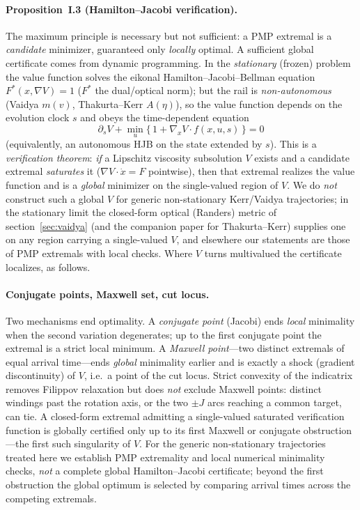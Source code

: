 \documentclass[12pt]{iopart}
\begin{document}
\paragraph{Proposition~I.3 (Hamilton--Jacobi verification).} The maximum
principle is necessary but not sufficient: a PMP extremal is a \emph{candidate}
minimizer, guaranteed only \emph{locally} optimal. A sufficient global certificate
comes from dynamic programming. In the \emph{stationary} (frozen) problem the value
function solves the eikonal Hamilton--Jacobi--Bellman equation
$F^\ast(x,\nabla V)=1$ ($F^\ast$ the dual/optical norm); but the rail is
\emph{non-autonomous} (Vaidya $m(v)$, Thakurta--Kerr $A(\eta)$), so the value function
depends on the evolution clock $s$ and obeys the time-dependent equation
\begin{equation}
  \partial_s V+\min_{u}\big\{\,1+\nabla_x V\cdot f(x,u,s)\,\big\}=0
  \label{eq:hjb}
\end{equation}
(equivalently, an autonomous HJB on the state extended by $s$). This is a
\emph{verification theorem}: \emph{if} a Lipschitz viscosity subsolution $V$ exists
and a candidate extremal \emph{saturates} it ($\nabla V\cdot\dot x=F$ pointwise), then
that extremal realizes the value function and is a \emph{global} minimizer on the
single-valued region of $V$. We do \emph{not} construct such a global $V$ for generic
non-stationary Kerr/Vaidya trajectories; in the stationary limit the closed-form
optical (Randers) metric of section~\ref{sec:vaidya} (and the companion paper for Thakurta--Kerr) supplies one on
any region carrying a single-valued $V$, and elsewhere our statements are those of PMP
extremals with local checks. Where $V$ turns multivalued the certificate localizes, as
follows.

\paragraph{Conjugate points, Maxwell set, cut locus.} Two mechanisms end
optimality. A \emph{conjugate point} (Jacobi) ends \emph{local} minimality when
the second variation degenerates; up to the first conjugate point the extremal is
a strict local minimum. A \emph{Maxwell point}---two distinct extremals of equal
arrival time---ends \emph{global} minimality earlier and is exactly a shock
(gradient discontinuity) of $V$, i.e.\ a point of the cut locus. Strict convexity
of the indicatrix removes Filippov relaxation but does \emph{not} exclude Maxwell
points: distinct windings past the rotation axis, or the two $\pm J$ arcs reaching
a common target, can tie. A closed-form extremal admitting a single-valued saturated
verification function is globally certified only up to its first Maxwell or conjugate
obstruction---the first such singularity of $V$. For the generic non-stationary
trajectories treated here we establish PMP extremality and local numerical minimality
checks, \emph{not} a complete global Hamilton--Jacobi certificate; beyond the first
obstruction the global optimum is selected by comparing arrival times across the competing
extremals.
\end{document}
